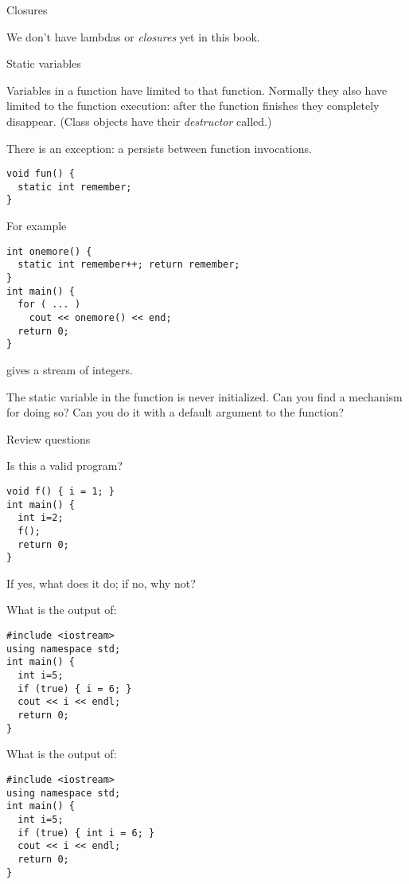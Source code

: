  {Closures}

We don't have
%
lambdas
or
%
\emph{closures} yet in this book.

 {Static variables}
\label{sec:static-scope}

Variables in a function have  limited to
that function. Normally they also have 
limited to the function execution: after the function finishes they
completely disappear. (Class objects have their
%
\emph{destructor}
called.)

There is an exception: a  persists
between function invocations.
\begin{verbatim}
void fun() {
  static int remember;
}
\end{verbatim}
For example
\begin{verbatim}
int onemore() {
  static int remember++; return remember;
}
int main() {
  for ( ... )
    cout << onemore() << end;
  return 0;
}
\end{verbatim}
gives a stream of integers.
\begin{exercise}
  The static variable in the  function is never
  initialized. Can you find a mechanism for doing so?
  Can you do it with a default argument to the function?
\end{exercise}

 {Review questions}

\begin{exercise}
  \label{ex:cpp-scope1}
  Is this a valid program?
\begin{verbatim}
void f() { i = 1; }
int main() {
  int i=2;
  f();
  return 0;
}
\end{verbatim}
If yes, what does it do; if no, why not?
\end{exercise}

\begin{exercise}
  \label{ex:cpp-scope2}
  What is the output of:
\begin{verbatim}
#include <iostream>
using namespace std;
int main() {
  int i=5;
  if (true) { i = 6; }
  cout << i << endl;
  return 0;
}
\end{verbatim}
\end{exercise}

\begin{exercise}
  \label{ex:cpp-scope3}
  What is the output of:
\begin{verbatim}
#include <iostream>
using namespace std;
int main() {
  int i=5;
  if (true) { int i = 6; }
  cout << i << endl;
  return 0;
}
\end{verbatim}
\end{exercise}

